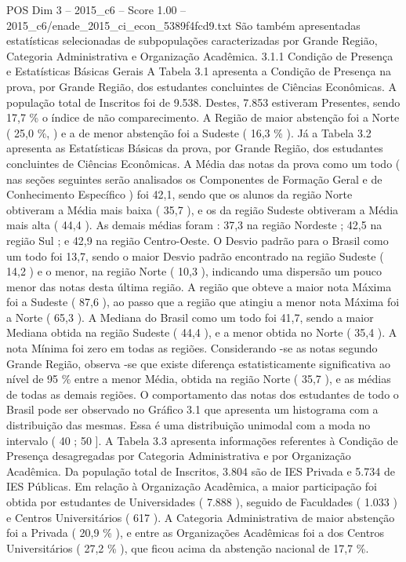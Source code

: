 \begin{textsample}{POS Dim 3 – 2015\_c6 – Score 1.00 – 2015\_c6/enade\_2015\_ci\_econ\_5389f4fcd9.txt}
São também apresentadas estatísticas selecionadas de subpopulações caracterizadas por Grande Região, Categoria Administrativa e Organização Acadêmica. 3.1.1 Condição de Presença e Estatísticas Básicas Gerais A Tabela 3.1 apresenta a Condição de Presença na prova, por Grande Região, dos estudantes concluintes de Ciências Econômicas.
A população total de Inscritos foi de 9.538.
Destes, 7.853 estiveram Presentes, sendo 17,7 \% o índice de não comparecimento.
A Região de maior abstenção foi a Norte ( 25,0 \%, ) e a de menor abstenção foi a Sudeste ( 16,3 \% ).
Já a Tabela 3.2 apresenta as Estatísticas Básicas da prova, por Grande Região, dos estudantes concluintes de Ciências Econômicas.
A Média das notas da prova como um todo ( nas seções seguintes serão analisados os Componentes de Formação Geral e de Conhecimento Específico ) foi 42,1, sendo que os alunos da região Norte obtiveram a Média mais baixa ( 35,7 ), e os da região Sudeste obtiveram a Média mais alta ( 44,4 ).
As demais médias foram : 37,3 na região Nordeste ; 42,5 na região Sul ; e 42,9 na região Centro-Oeste.
O Desvio padrão para o Brasil como um todo foi 13,7, sendo o maior Desvio padrão encontrado na região Sudeste ( 14,2 ) e o menor, na região Norte ( 10,3 ), indicando uma dispersão um pouco menor das notas desta última região.
A região que obteve a maior nota Máxima foi a Sudeste ( 87,6 ), ao passo que a região que atingiu a menor nota Máxima foi a Norte ( 65,3 ).
A Mediana do Brasil como um todo foi 41,7, sendo a maior Mediana obtida na região Sudeste ( 44,4 ), e a menor obtida no Norte ( 35,4 ).
A nota Mínima foi zero em todas as regiões.
Considerando -se as notas segundo Grande Região, observa -se que existe diferença estatisticamente significativa ao nível de 95 \% entre a menor Média, obtida na região Norte ( 35,7 ), e as médias de todas as demais regiões.
O comportamento das notas dos estudantes de todo o Brasil pode ser observado no Gráfico 3.1 que apresenta um histograma com a distribuição das mesmas.
Essa é uma distribuição unimodal com a moda no intervalo ( 40 ; 50 ].
A Tabela 3.3 apresenta informações referentes à Condição de Presença desagregadas por Categoria Administrativa e por Organização Acadêmica.
Da população total de Inscritos, 3.804 são de IES Privada e 5.734 de IES Públicas.
Em relação à Organização Acadêmica, a maior participação foi obtida por estudantes de Universidades ( 7.888 ), seguido de Faculdades ( 1.033 ) e Centros Universitários ( 617 ).
A Categoria Administrativa de maior abstenção foi a Privada ( 20,9 \% ), e entre as Organizações Acadêmicas foi a dos Centros Universitários ( 27,2 \% ), que ficou acima da abstenção nacional de 17,7 \%.

\end{textsample}
